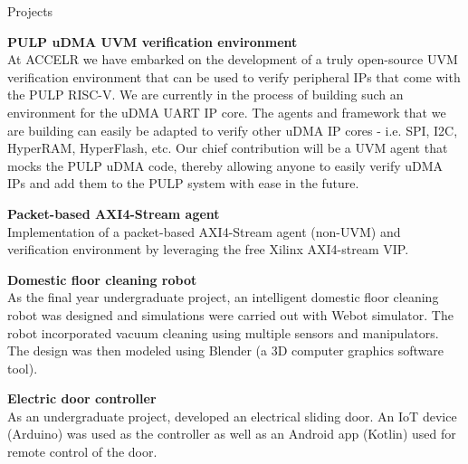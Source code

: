 \documentclass[
	11pt, %
]{resume} %
\begin{document}

\begin{rSection}{Projects}

	\textbf{PULP uDMA UVM verification environment} \\
	At ACCELR we have embarked on the development of a truly open-source UVM verification environment that can be used to verify peripheral IPs that come with the PULP RISC-V. We are currently in the process of building such an environment for the uDMA UART IP core. The agents and framework that we are building can easily be adapted to verify other uDMA IP cores - i.e. SPI, I2C, HyperRAM, HyperFlash, etc. Our chief contribution will be a UVM agent that mocks the PULP uDMA code, thereby allowing anyone to easily verify uDMA IPs and add them to the PULP system with ease in the future.

	\textbf{Packet-based AXI4-Stream agent} \\
	Implementation of a packet-based AXI4-Stream agent (non-UVM) and verification environment by leveraging the free Xilinx AXI4-stream VIP.

	\textbf{Domestic floor cleaning robot} \\
	As the final year undergraduate project, an intelligent domestic floor cleaning robot was designed and simulations were carried out with Webot simulator. The robot incorporated vacuum cleaning using multiple sensors and manipulators. The design was then modeled using Blender (a 3D computer graphics software tool).

	\textbf{Electric door controller} \\
	As an undergraduate project, developed an electrical sliding door. An IoT device (Arduino) was used as the controller as well as an Android app (Kotlin) used for remote control of the door.

\end{rSection}




\end{document}
